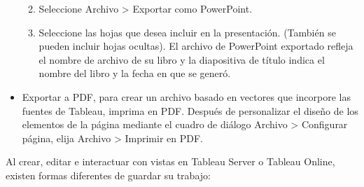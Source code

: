 \documentclass[
]{book}
\providecommand{\tightlist}{%
  \setlength{\itemsep}{0pt}\setlength{\parskip}{0pt}}
\begin{document}
\begin{itemize}
  \begin{enumerate}
  \def\labelenumi{\arabic{enumi}.}
  \tightlist
  \item
    Seleccione Archivo \textgreater{} Exportar como PowerPoint.
  \item
    Seleccione las hojas que desea incluir en la presentación. (También se pueden incluir hojas ocultas). El archivo de PowerPoint exportado refleja el nombre de archivo de su libro y la diapositiva de título indica el nombre del libro y la fecha en que se generó.
  \end{enumerate}
\item
  Exportar a PDF, para crear un archivo basado en vectores que incorpore las fuentes de Tableau, imprima en PDF. Después de personalizar el diseño de los elementos de la página mediante el cuadro de diálogo Archivo \textgreater{} Configurar página, elija Archivo \textgreater{} Imprimir en PDF.
\end{itemize}

Al crear, editar e interactuar con vistas en Tableau Server o Tableau Online, existen formas diferentes de guardar su trabajo:
\end{document}
